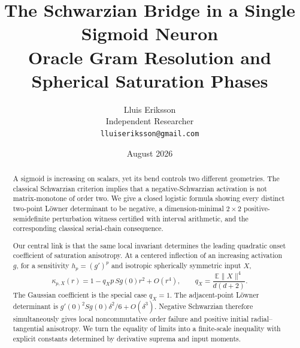 \documentclass[11pt]{article}
\title{\bfseries The Schwarzian Bridge in a Single Sigmoid Neuron\\
\large Oracle Gram Resolution and Spherical Saturation Phases}
\author{Lluis Eriksson\\Independent Researcher\\\texttt{lluiseriksson@gmail.com}}
\date{August 2026}
\newcommand{\E}{\mathbb E}
\begin{document}
\maketitle

\begin{abstract}
A sigmoid is increasing on scalars, yet its bend controls two different geometries.  The classical Schwarzian
criterion implies that a negative-Schwarzian activation is not matrix-monotone of order two.  We give a closed
logistic formula showing every distinct two-point L\"owner determinant to be negative, a dimension-minimal
$2\times2$ positive-semidefinite perturbation witness certified with interval arithmetic, and the corresponding
classical serial-chain consequence.

Our central link is that the same local invariant determines the leading quadratic onset coefficient of saturation
anisotropy.  At a centered inflection of an increasing activation $g$, for a sensitivity $h_p=(g')^p$ and
isotropic spherically symmetric input $X$,
\[
 \kappa_{p,X}(r)=1-q_Xp\,Sg(0)r^2+O(r^4),\qquad
 q_X=\frac{\E\lVert X\rVert^4}{d(d+2)}.
\]
The Gaussian coefficient is the special case $q_X=1$.  The adjacent-point L\"owner determinant is
$g'(0)^2Sg(0)\delta^2/6+O(\delta^3)$.  Negative Schwarzian therefore simultaneously gives local
noncommutative order failure and positive initial radial--tangential anisotropy.  We turn the equality of limits
into a finite-scale inequality with explicit constants determined by derivative suprema and input moments.


\end{abstract}
\end{document}
